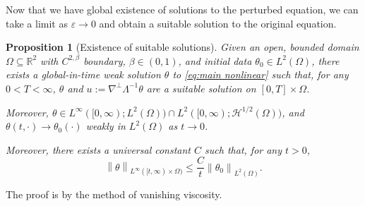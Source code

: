 \documentclass[11pt]{amsart}
\newtheorem{proposition}[theorem]{Proposition}
\theoremstyle{remark}
\theoremstyle{definition}
\newcommand{\R}{\mathbb{R}}
\newcommand{\eps}{\varepsilon}
\newcommand{\norm}[1]{\left\lVert#1\right\rVert}
\newcommand{\grad}{\nabla}
\newcommand{\HD}{\mathcal{H}}
\begin{document}
Now that we have global existence of solutions to the perturbed equation, we can take a limit as $\eps \to 0$ and obtain a suitable solution to the original equation.  

\begin{proposition}[Existence of suitable solutions] \label{thm:existence}
Given an open, bounded domain $\Omega \subseteq \R^2$ with $C^{2,\beta}$ boundary, $\beta \in (0,1)$, and initial data $\theta_0 \in L^2(\Omega)$, there exists a global-in-time weak solution $\theta$ to \eqref{eq:main nonlinear} such that, for any $0 < T < \infty$, $\theta$ and $u := \grad^\perp \Lambda^{-1} \theta$ are a suitable solution on $[0,T] \times \Omega$.  

Moreover, $\theta \in L^\infty([0,\infty);L^2(\Omega)) \cap L^2([0,\infty);\HD^{1/2}(\Omega))$, and $\theta(t,\cdot) \to \theta_0(\cdot)$ weakly in $L^2(\Omega)$ as $t \to 0$.

Moreover, there exists a universal constant $C$ such that, for any $t>0$, 
\[ \norm{\theta}_{L^\infty([t,\infty)\times\Omega)} \leq \frac{C}{t} \norm{\theta_0}_{L^2(\Omega)}. \]
\end{proposition}

The proof is by the method of vanishing viscosity.  
\end{document}
